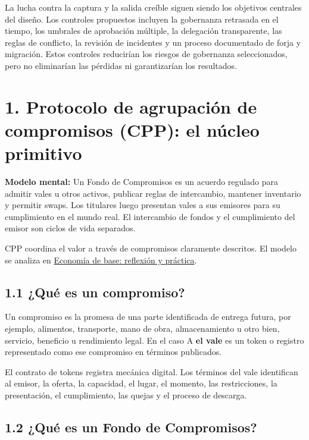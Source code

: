 \documentclass[11pt]{article}
\begin{document}
La lucha contra la captura y la salida creíble siguen siendo los objetivos centrales del diseño. Los controles propuestos incluyen la gobernanza retrasada en el tiempo, los umbrales de aprobación múltiple, la delegación transparente, las reglas de conflicto, la revisión de incidentes y un proceso documentado de forja y migración. Estos controles reducirían los riesgos de gobernanza seleccionados, pero no eliminarían las pérdidas ni garantizarían los resultados.


\section*{1. Protocolo de agrupación de compromisos (CPP): el núcleo primitivo}

\textbf{Modelo mental:} Un Fondo de Compromisos es un acuerdo regulado para admitir vales u otros activos, publicar reglas de intercambio, mantener inventario y permitir swaps. Los titulares luego presentan vales a sus emisores para su cumplimiento en el mundo real. El intercambio de fondos y el cumplimiento del emisor son ciclos de vida separados.

CPP coordina el valor a través de compromisos claramente descritos. El modelo se analiza en \href{https://willruddick.substack.com/p/grassroots-economics-the-book-is}{Economía de base: reflexión y práctica}.

\subsection*{1.1 ¿Qué es un compromiso?}

Un compromiso es la promesa de una parte identificada de entrega futura, por ejemplo, alimentos, transporte, mano de obra, almacenamiento u otro bien, servicio, beneficio u rendimiento legal. En el caso A \textbf{el vale} es un token o registro representado como ese compromiso en términos publicados.

El contrato de tokens registra mecánica digital. Los términos del vale identifican al emisor, la oferta, la capacidad, el lugar, el momento, las restricciones, la presentación, el cumplimiento, las quejas y el proceso de descarga.

\subsection*{1.2 ¿Qué es un Fondo de Compromisos?}
\end{document}

